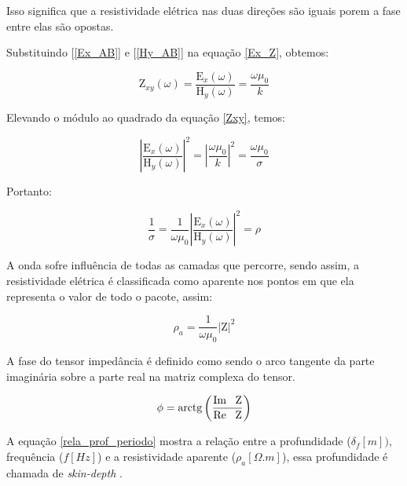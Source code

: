         Isso significa que a resistividade elétrica nas duas direções são iguais porem a fase entre elas são opostas.
        
        Substituindo [\ref{Ex_AB}] e [\ref{Hy_AB}] na equação \ref{Ex_Z}, obtemos:
        
        \begin{equation}
        \label{Zxy}
         \textrm{Z}_{xy}(\omega) = \dfrac{\textrm{E}_x(\omega)}{\textrm{H}_y(\omega)} = \dfrac{\omega \mu_0}{k}
        \end{equation}
        
        Elevando o módulo ao quadrado da equação \ref{Zxy}, temos:
        
        \begin{equation}
         \left | \dfrac{\textrm{E}_x(\omega)}{\textrm{H}_y(\omega)} \right | ^2 = \left | \dfrac{\omega \mu_0}{k} \right | ^2 = \dfrac{\omega \mu_0}{\sigma}
        \end{equation}
        
        Portanto:
        
        \begin{equation}
         \dfrac{1}{\sigma} = \dfrac{1}{\omega \mu_0} \left | \dfrac{\textrm{E}_x(\omega)}{\textrm{H}_y(\omega)} \right | ^2 = \rho
        \end{equation}
        
        A onda sofre influência de todas as camadas que percorre, sendo assim, a resistividade elétrica é classificada como aparente nos pontos em que ela representa o valor de todo o pacote, assim:
        
        \begin{equation}
         \rho_a = \dfrac{1}{\omega \mu_0} \left | \textrm{Z} \right | ^2
        \end{equation}
        
        A fase do tensor impedância é definido como sendo o arco tangente da parte imaginária sobre a parte real na matriz complexa do tensor.
        
        \begin{equation}
         \phi = \textrm{arctg} \left ( \dfrac{\textrm{Im \, Z}}{\textrm{Re \, Z}} \right )
        \end{equation}
        
        A equação \ref{rela_prof_periodo} mostra a relação entre a profundidade
	($\delta_f[m])$, frequência ($f[Hz]$) e a resistividade aparente ($\rho_a[\Omega.m]$), essa 
	profundidade é chamada de \textit{skin-depth} \cite{eletromag8hayt}.
	
